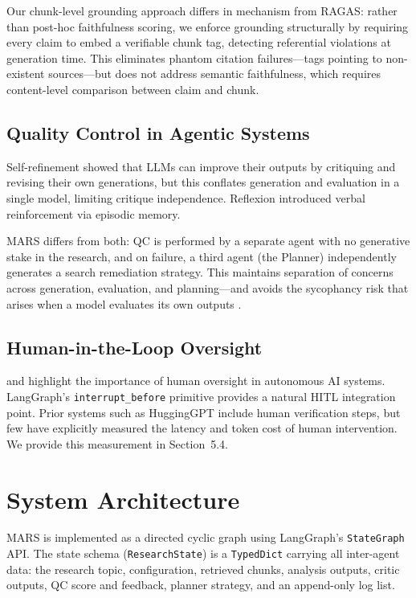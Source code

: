 \documentclass[11pt]{article}
\begin{document}
Our chunk-level grounding approach differs in mechanism from RAGAS: rather than
post-hoc faithfulness scoring, we enforce grounding structurally by requiring
every claim to embed a verifiable chunk tag, detecting referential violations at
generation time. This eliminates phantom citation failures---tags pointing to
non-existent sources---but does not address semantic faithfulness, which requires
content-level comparison between claim and chunk.

\subsection{Quality Control in Agentic Systems}

Self-refinement \citep{madaan2023selfrefine} showed that LLMs can improve their
outputs by critiquing and revising their own generations, but this conflates
generation and evaluation in a single model, limiting critique independence.
Reflexion \citep{shinn2023reflexion} introduced verbal reinforcement via episodic
memory.

MARS differs from both: QC is performed by a separate agent with no generative
stake in the research, and on failure, a third agent (the Planner) independently
generates a search remediation strategy. This maintains separation of concerns
across generation, evaluation, and planning---and avoids the sycophancy risk that
arises when a model evaluates its own outputs \citep{sycophancy2023}.

\subsection{Human-in-the-Loop Oversight}

\citet{seshia2018formal} and \citet{anthropic2023modelspec} highlight the
importance of human oversight in autonomous AI systems. LangGraph's
\texttt{interrupt\_before} primitive provides a natural HITL integration point.
Prior systems such as HuggingGPT \citep{shen2023hugginggpt} include human
verification steps, but few have explicitly measured the latency and token cost
of human intervention. We provide this measurement in Section~5.4.

\section{System Architecture}

MARS is implemented as a directed cyclic graph using LangGraph's
\texttt{StateGraph} API. The state schema (\texttt{ResearchState}) is a
\texttt{TypedDict} carrying all inter-agent data: the research topic,
configuration, retrieved chunks, analysis outputs, critic outputs, QC score and
feedback, planner strategy, and an append-only log list.
\end{document}
